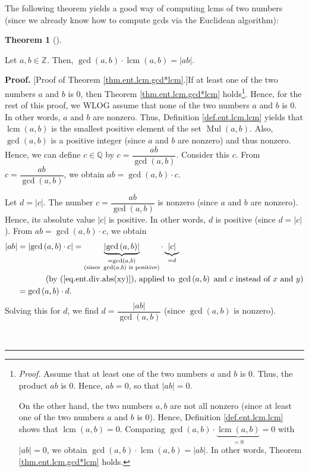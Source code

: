\documentclass[numbers=enddot,12pt,final,onecolumn,notitlepage]{scrartcl}%
\numberwithin{exer}{subsection}
\theoremstyle{definition}
\newtheorem{theo}{Theorem}[subsection]
\newenvironment{theorem}[1][]
{\begin{theo}[#1]\begin{leftbar}}
{\end{leftbar}\end{theo}}
\newenvironment{proof}[1][Proof]{\noindent\textbf{#1.} }{\ \rule{0.5em}{0.5em}}
\begin{document}
The following theorem yields a good way of computing lcms of two numbers
(since we already know how to compute gcds via the Euclidean algorithm):

\begin{theorem}
\label{thm.ent.lcm.gcd*lcm}Let $a,b\in\mathbb{Z}$. Then, $\gcd\left(
a,b\right)  \cdot\operatorname{lcm}\left(  a,b\right)  =\left\vert
ab\right\vert $.
\end{theorem}

\begin{proof}
[Proof of Theorem \ref{thm.ent.lcm.gcd*lcm}.]If at least one of the two
numbers $a$ and $b$ is $0$, then Theorem \ref{thm.ent.lcm.gcd*lcm}
holds\footnote{\textit{Proof.} Assume that at least one of the two numbers $a$
and $b$ is $0$. Thus, the product $ab$ is $0$. Hence, $ab=0$, so that
$\left\vert ab\right\vert =0$.
\par
On the other hand, the two numbers $a,b$ are not all nonzero (since at least
one of the two numbers $a$ and $b$ is $0$). Hence, Definition
\ref{def.ent.lcm.lcm} shows that $\operatorname{lcm}\left(  a,b\right)  =0$.
Comparing $\gcd\left(  a,b\right)  \cdot\underbrace{\operatorname{lcm}\left(
a,b\right)  }_{=0}=0$ with $\left\vert ab\right\vert =0$, we obtain
$\gcd\left(  a,b\right)  \cdot\operatorname{lcm}\left(  a,b\right)
=\left\vert ab\right\vert $. In other words, Theorem \ref{thm.ent.lcm.gcd*lcm}
holds.}. Hence, for the rest of this proof, we WLOG assume that none of the
two numbers $a$ and $b$ is $0$. In other words, $a$ and $b$ are nonzero. Thus,
Definition \ref{def.ent.lcm.lcm} yields that $\operatorname{lcm}\left(
a,b\right)  $ is the smallest positive element of the set $\operatorname*{Mul}%
\left(  a,b\right)  $. Also, $\gcd\left(  a,b\right)  $ is a positive integer
(since $a$ and $b$ are nonzero) and thus nonzero. Hence, we can define
$c\in\mathbb{Q}$ by $c=\dfrac{ab}{\gcd\left(  a,b\right)  }$. Consider this
$c$. From $c=\dfrac{ab}{\gcd\left(  a,b\right)  }$, we obtain $ab=\gcd\left(
a,b\right)  \cdot c$.

Let $d=\left\vert c\right\vert $. The number $c=\dfrac{ab}{\gcd\left(
a,b\right)  }$ is nonzero (since $a$ and $b$ are nonzero). Hence, its absolute
value $\left\vert c\right\vert $ is positive. In other words, $d$ is positive
(since $d=\left\vert c\right\vert $). From $ab=\gcd\left(  a,b\right)  \cdot
c$, we obtain%
\begin{align}
\left\vert ab\right\vert  &  =\left\vert \gcd\left(  a,b\right)  \cdot
c\right\vert =\underbrace{\left\vert \gcd\left(  a,b\right)  \right\vert
}_{\substack{=\gcd\left(  a,b\right)  \\\text{(since }\gcd\left(  a,b\right)
\text{ is positive)}}}\cdot\underbrace{\left\vert c\right\vert }%
_{=d}\nonumber\\
&  \ \ \ \ \ \ \ \ \ \ \left(  \text{by (\ref{eq.ent.div.abs(xy)}), applied to
}\gcd\left(  a,b\right)  \text{ and }c\text{ instead of }x\text{ and }y\right)
\nonumber\\
&  =\gcd\left(  a,b\right)  \cdot d. \label{pf.thm.ent.lcm.gcd*lcm.1}%
\end{align}
Solving this for $d$, we find $d=\dfrac{\left\vert ab\right\vert }{\gcd\left(
a,b\right)  }$ (since $\gcd\left(  a,b\right)  $ is nonzero).


\end{proof}
\end{document}
